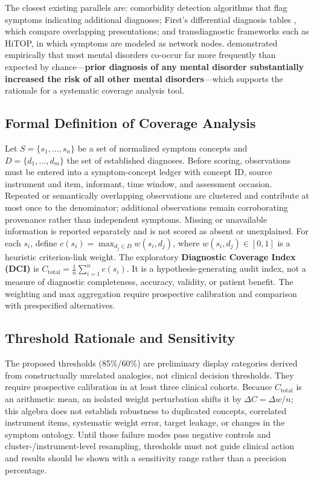 \documentclass[11pt,a4paper]{article}
\begin{document}
The closest existing parallels are: comorbidity detection algorithms that flag symptoms indicating additional diagnoses; First's differential diagnosis tables \citep{First2024}, which compare overlapping presentations; and transdiagnostic frameworks such as HiTOP, in which symptoms are modeled as network nodes. \citet{PlanaRipoll2019} demonstrated empirically that most mental disorders co-occur far more frequently than expected by chance---\textbf{prior diagnosis of any mental disorder substantially increased the risk of all other mental disorders}---which supports the rationale for a systematic coverage analysis tool.

\subsection{Formal Definition of Coverage Analysis}

Let $S = \{s_1, \ldots, s_n\}$ be a set of normalized symptom concepts and $D = \{d_1, \ldots, d_m\}$ the set of established diagnoses. Before scoring, observations must be entered into a symptom-concept ledger with concept ID, source instrument and item, informant, time window, and assessment occasion. Repeated or semantically overlapping observations are clustered and contribute at most once to the denominator; additional observations remain corroborating provenance rather than independent symptoms. Missing or unavailable information is reported separately and is not scored as absent or unexplained. For each $s_i$, define $c(s_i) = \max_{d_j \in D} w(s_i, d_j)$, where $w(s_i, d_j) \in [0, 1]$ is a heuristic criterion-link weight. The exploratory \textbf{Diagnostic Coverage Index (DCI)} is $C_{\text{total}} = \frac{1}{n} \sum_{i=1}^{n} c(s_i)$. It is a hypothesis-generating audit index, not a measure of diagnostic completeness, accuracy, validity, or patient benefit. The weighting and max aggregation require prospective calibration and comparison with prespecified alternatives.

\subsection{Threshold Rationale and Sensitivity}

The proposed thresholds (85\%/60\%) are preliminary display categories derived from constructually unrelated analogies, not clinical decision thresholds. They require prospective calibration in at least three clinical cohorts. Because $C_{\text{total}}$ is an arithmetic mean, an isolated weight perturbation shifts it by $\Delta C = \Delta w/n$; this algebra does not establish robustness to duplicated concepts, correlated instrument items, systematic weight error, target leakage, or changes in the symptom ontology. Until those failure modes pass negative controls and cluster-/instrument-level resampling, thresholds must not guide clinical action and results should be shown with a sensitivity range rather than a precision percentage.
\end{document}
